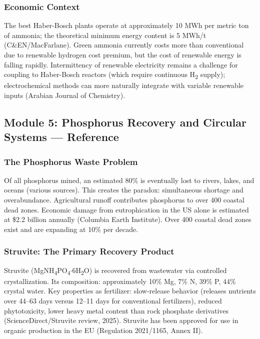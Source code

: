 \documentclass[11pt,letterpaper]{article}
\begin{document}
\subsubsection{Economic Context}

The best Haber-Bosch plants operate at approximately 10 MWh per metric ton of ammonia; the theoretical minimum energy content is 5 MWh/t (C\&EN/MacFarlane). Green ammonia currently costs more than conventional due to renewable hydrogen cost premium, but the cost of renewable energy is falling rapidly. Intermittency of renewable electricity remains a challenge for coupling to Haber-Bosch reactors (which require continuous H\textsubscript{2} supply); electrochemical methods can more naturally integrate with variable renewable inputs (Arabian Journal of Chemistry).

\subsection{Module 5: Phosphorus Recovery and Circular Systems --- Reference}

\subsubsection{The Phosphorus Waste Problem}

Of all phosphorus mined, an estimated 80\% is eventually lost to rivers, lakes, and oceans (various sources). This creates the paradox: simultaneous shortage and overabundance. Agricultural runoff contributes phosphorus to over 400 coastal dead zones. Economic damage from eutrophication in the US alone is estimated at \$2.2 billion annually (Columbia Earth Institute). Over 400 coastal dead zones exist and are expanding at 10\% per decade.

\subsubsection{Struvite: The Primary Recovery Product}

Struvite (MgNH\textsubscript{4}PO\textsubscript{4}$\cdot$6H\textsubscript{2}O) is recovered from wastewater via controlled crystallization. Its composition: approximately 10\% Mg, 7\% N, 39\% P, 44\% crystal water. Key properties as fertilizer: slow-release behavior (releases nutrients over 44--63 days versus 12--11 days for conventional fertilizers), reduced phytotoxicity, lower heavy metal content than rock phosphate derivatives (ScienceDirect/Struvite review, 2025). Struvite has been approved for use in organic production in the EU (Regulation 2021/1165, Annex II).
\end{document}
